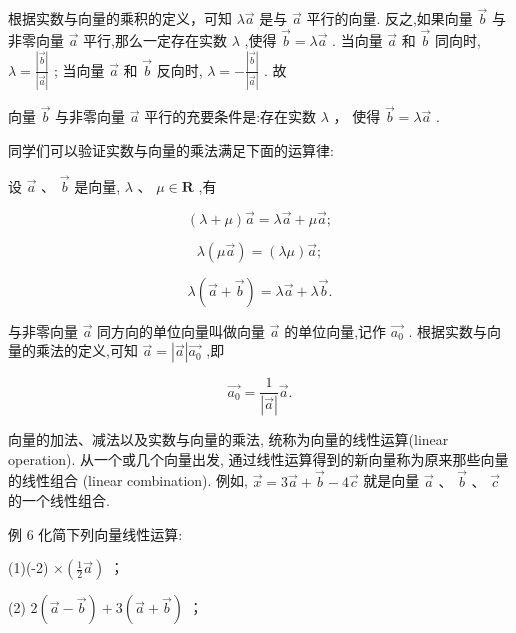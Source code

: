 \documentclass[10pt]{article}
\begin{document}
根据实数与向量的乘积的定义，可知 \(\lambda \overrightarrow{a}\) 是与 \(\overrightarrow{a}\) 平行的向量. 反之,如果向量 \(\overrightarrow{b}\) 与非零向量 \(\overrightarrow{a}\) 平行,那么一定存在实数 \(\lambda\) ,使得 \(\overrightarrow{b} = \lambda \overrightarrow{a}\) . 当向量 \(\overrightarrow{a}\) 和 \(\overrightarrow{b}\) 同向时, \(\lambda  = \frac{\left| \overrightarrow{b}\right| }{\left| \overrightarrow{a}\right| }\) ; 当向量 \(\overrightarrow{a}\) 和 \(\overrightarrow{b}\) 反向时, \(\lambda  =  - \frac{\left| \overrightarrow{b}\right| }{\left| \overrightarrow{a}\right| }\) . 故

向量 \(\overrightarrow{b}\) 与非零向量 \(\overrightarrow{a}\) 平行的充要条件是:存在实数 \(\lambda\) ， 使得 \(\overrightarrow{b} = \lambda \overrightarrow{a}\) .

同学们可以验证实数与向量的乘法满足下面的运算律:

设 \(\overrightarrow{a}\text{ 、 }\overrightarrow{b}\) 是向量, \(\lambda \text{ 、 }\mu  \in  \mathbf{R}\) ,有

\[
\left( {\lambda  + \mu }\right) \overrightarrow{a} = \lambda \overrightarrow{a} + \mu \overrightarrow{a};
\]

\[
\lambda \left( {\mu \overrightarrow{a}}\right)  = \left( {\lambda \mu }\right) \overrightarrow{a};
\]

\[
\lambda \left( {\overrightarrow{a} + \overrightarrow{b}}\right)  = \lambda \overrightarrow{a} + \lambda \overrightarrow{b}.
\]

与非零向量 \(\overrightarrow{a}\) 同方向的单位向量叫做向量 \(\overrightarrow{a}\) 的单位向量,记作 \(\overrightarrow{{a}_{0}}\) . 根据实数与向量的乘法的定义,可知 \(\overrightarrow{a} = \left| \overrightarrow{a}\right| \overrightarrow{{a}_{0}}\) ,即

\[
\overrightarrow{{a}_{0}} = \frac{1}{\left| \overrightarrow{a}\right| }\overrightarrow{a}.
\]

向量的加法、减法以及实数与向量的乘法, 统称为向量的线性运算(linear operation). 从一个或几个向量出发, 通过线性运算得到的新向量称为原来那些向量的线性组合 (linear combination). 例如, \(\overrightarrow{x} = 3\overrightarrow{a} + \overrightarrow{b} - 4\overrightarrow{c}\) 就是向量 \(\overrightarrow{a}\text{ 、 }\overrightarrow{b}\text{ 、 }\overrightarrow{c}\) 的一个线性组合.

例 6 化简下列向量线性运算:

(1)(-2) \(\times  \left( {\frac{1}{2}\overrightarrow{a}}\right)\) ；

(2) \(2\left( {\overrightarrow{a} - \overrightarrow{b}}\right)  + 3\left( {\overrightarrow{a} + \overrightarrow{b}}\right)\) ；
\end{document}
